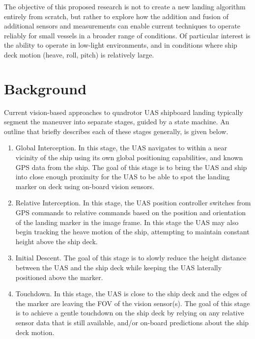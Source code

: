 \documentclass[12pt, letterpaper]{article}
\begin{document}

The objective of this proposed research is not to create a new landing algorithm entirely from scratch, but rather to explore how the addition and fusion of additional sensors and measurements can enable current techniques to operate reliably for small vessels in a broader range of conditions.  Of particular interest is the ability to operate in low-light environments, and in conditions where ship deck motion (heave, roll, pitch) is relatively large.


\section{Background}


Current vision-based approaches to quadrotor UAS shipboard landing typically segment the maneuver into separate stages, guided by a state machine.  An outline that briefly describes each of these stages generally, is given below.   

\begin{enumerate}
\item Global Interception.  In this stage, the UAS navigates to within a near vicinity of the ship using its own global positioning capabilities, and known GPS data from the ship.  The goal of this stage is to bring the UAS and ship into close enough proximity for the UAS to be able to spot the landing marker on deck using on-board vision sensors.
\item Relative Interception.  In this stage, the UAS position controller switches from GPS commands to relative commands based on the position and orientation of the landing marker in the image frame.  In this stage the UAS may also begin tracking the heave motion of the ship, attempting to maintain constant height above the ship deck.
\item Initial Descent.  The goal of this stage is to slowly reduce the height distance between the UAS and the ship deck while keeping the UAS laterally positioned above the marker.
\item Touchdown. In this stage, the UAS is close to the ship deck and the edges of the marker are leaving the FOV of the vision sensor(s).  The goal of this stage is to achieve a gentle touchdown on the ship deck by relying on any relative sensor data that is still available, and/or on-board predictions about the ship deck motion.
\end{enumerate}
\end{document}
